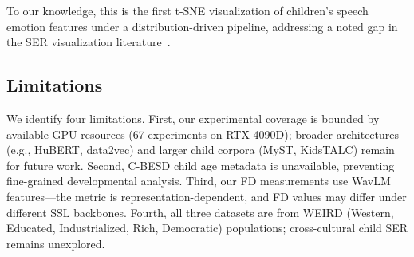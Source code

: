 \noindent To our knowledge, this is the first t-SNE visualization of
children's speech emotion features under a distribution-driven pipeline,
addressing a noted gap in the SER visualization literature~\cite{kanwal2022speech}.

\subsection{Limitations}

We identify four limitations. First, our experimental coverage is bounded by
available GPU resources (67 experiments on RTX 4090D); broader architectures
(e.g., HuBERT, data2vec) and larger child corpora (MyST, KidsTALC) remain for
future work. Second, C-BESD child age metadata is unavailable, preventing
fine-grained developmental analysis. Third, our FD measurements use WavLM
features---the metric is representation-dependent, and FD values may differ
under different SSL backbones. Fourth, all three datasets are from WEIRD
(Western, Educated, Industrialized, Rich, Democratic) populations;
cross-cultural child SER remains unexplored.
